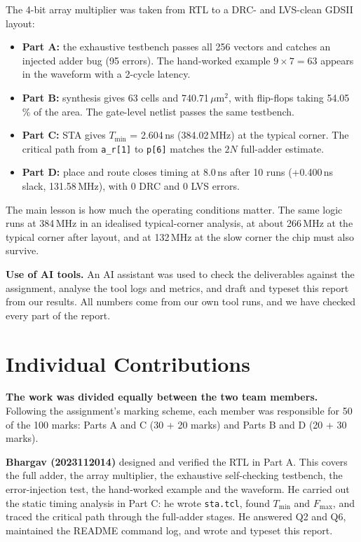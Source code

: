 \documentclass[10pt,a4paper,twocolumn]{article}
\newcommand{\umsq}{\,$\mu$m$^2$}
\newcommand{\Tmin}{$T_{\min}$}
\newcommand{\Fmax}{$F_{\max}$}
\begin{document}
The 4-bit array multiplier was taken from RTL to a DRC- and LVS-clean GDSII layout:
\begin{itemize}
  \item \textbf{Part A:} the exhaustive testbench passes all 256 vectors and catches an injected adder bug (95 errors). The hand-worked example $9 \times 7 = 63$ appears in the waveform with a 2-cycle latency.
  \item \textbf{Part B:} synthesis gives 63 cells and 740.71\umsq, with flip-flops taking 54.05\,\% of the area. The gate-level netlist passes the same testbench.
  \item \textbf{Part C:} STA gives \Tmin{} = 2.604\,ns (384.02\,MHz) at the typical corner. The critical path from \texttt{a\_r[1]} to \texttt{p[6]} matches the $2N$ full-adder estimate.
  \item \textbf{Part D:} place and route closes timing at 8.0\,ns after 10 runs (+0.400\,ns slack, 131.58\,MHz), with 0 DRC and 0 LVS errors.
\end{itemize}
The main lesson is how much the operating conditions matter. The same logic runs at 384\,MHz in an idealised typical-corner analysis, at about 266\,MHz at the typical corner after layout, and at 132\,MHz at the slow corner the chip must also survive.

\textbf{Use of AI tools.} An AI assistant was used to check the deliverables against the assignment, analyse the tool logs and metrics, and draft and typeset this report from our results. All numbers come from our own tool runs, and we have checked every part of the report.

\section*{Individual Contributions}

\textbf{The work was divided equally between the two team members.} Following the assignment's marking scheme, each member was responsible for 50 of the 100 marks: Parts A and C (30 + 20 marks) and Parts B and D (20 + 30 marks).

\textbf{Bhargav (2023112014)} designed and verified the RTL in Part A. This covers the full adder, the array multiplier, the exhaustive self-checking testbench, the error-injection test, the hand-worked example and the waveform. He carried out the static timing analysis in Part C: he wrote \texttt{sta.tcl}, found \Tmin{} and \Fmax, and traced the critical path through the full-adder stages. He answered Q2 and Q6, maintained the README command log, and wrote and typeset this report.
\end{document}
